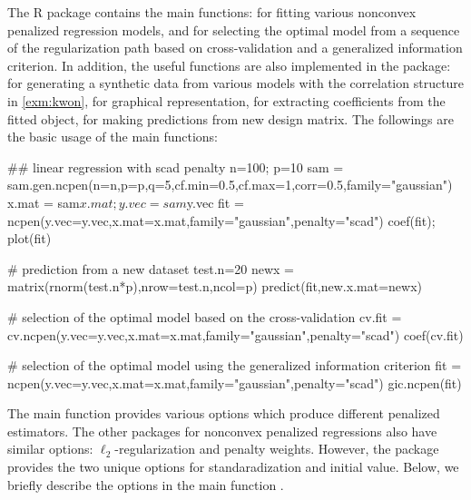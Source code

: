 The R package  contains the main functions:  for fitting various nonconvex penalized regression models,  and  for selecting the optimal model from a sequence of the regularization path based on cross-validation and a generalized information criterion\citep{wang2007tuning,wang2009shrinkage,fan2013tuning,wang2013calibrating}.
In addition, the useful functions are also implemented in the package:
 for generating a synthetic data from various models with the correlation structure in \eqref{exm:kwon},
 for graphical representation,  for extracting coefficients from the fitted object,
 for making predictions from new design matrix.
The followings are the basic usage of the main functions: 

\begin{example}
  ## linear regression with scad penalty
  n=100; p=10
  sam = sam.gen.ncpen(n=n,p=p,q=5,cf.min=0.5,cf.max=1,corr=0.5,family="gaussian")
  x.mat = sam$x.mat; y.vec = sam$y.vec
  fit = ncpen(y.vec=y.vec,x.mat=x.mat,family="gaussian",penalty="scad")
  coef(fit); plot(fit)

  # prediction from a new dataset
  test.n=20
  newx = matrix(rnorm(test.n*p),nrow=test.n,ncol=p)
  predict(fit,new.x.mat=newx)

  # selection of the optimal model based on the cross-validation
  cv.fit = cv.ncpen(y.vec=y.vec,x.mat=x.mat,family="gaussian",penalty="scad")
  coef(cv.fit)

  # selection of the optimal model using the generalized information criterion
  fit = ncpen(y.vec=y.vec,x.mat=x.mat,family="gaussian",penalty="scad")
  gic.ncpen(fit)
\end{example}

The main function  provides various options which produce different penalized estimators.
The other packages for nonconvex penalized regressions also have similar options: $\ell_2$-regularization and penalty weights.
However, the package  provides the two unique options for standaradization and initial value.
Below, we briefly describe the options in the main function .

